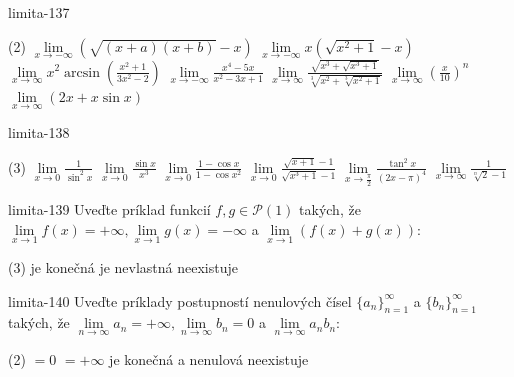 \begin{defproblem}{limita-137}
\begin{tasks}(2)
    \task $\lim\limits_{{x \rightarrow -\infty}} (\sqrt{(x+a)(x+b)}-x)$
    \task $\lim\limits_{{x \rightarrow -\infty}} x(\sqrt{x^2+1}-x)$
    \task $\lim\limits_{{x \rightarrow \infty}} x^2 \arcsin(\frac{x^2+1}{3x^2-2})$
    \task $\lim\limits_{{x \rightarrow -\infty}} \frac{x^4-5x}{x^2-3x+1}$
    \task $\lim\limits_{{x \rightarrow \infty}} \frac{\sqrt{x^3+\sqrt{x^3+1}}}{\sqrt[3]{x^2+\sqrt[3]{x^2+1}}}$
    \task $\lim\limits_{{x \rightarrow \infty}} (\frac{x}{10})^n$
    \task $\lim\limits_{{x \rightarrow \infty}} (2x+x \sin x)$
\end{tasks}
\end{defproblem}

\begin{defproblem}{limita-138}
\begin{tasks}(3)
    \task $\lim\limits_{{x \rightarrow 0}} \frac{1}{\sin ^2 x}$
    \task $\lim\limits_{{x \rightarrow 0}} \frac{\sin x}{x^3}$
    \task $\lim\limits_{{x \rightarrow 0}} \frac{1-\cos x}{1-\cos x^2}$
    \task $\lim\limits_{{x \rightarrow 0}} \frac{\sqrt{x+1}-1}{\sqrt{x^3+1}-1}$
    \task $\lim\limits_{{x \rightarrow \frac{\pi}{2}}} \frac{\tan ^2 x}{(2x-\pi)^4}$
    \task $\lim\limits_{{x \rightarrow \infty}} \frac{1}{\sqrt[n]{2}-1}$
\end{tasks}
\end{defproblem}

\begin{defproblem}{limita-139}
Uveďte príklad funkcií $f,g \in \mathcal{P}(1)$ takých, že $\lim\limits_{x
\rightarrow 1} f(x)=+\infty,\lim\limits_{x \rightarrow 1} g(x)=-\infty$ a
$\lim\limits_{x \rightarrow 1} (f(x)+g(x))$:
\begin{tasks}(3)
\task je konečná
\task je nevlastná
\task neexistuje
\end{tasks}
\end{defproblem}

\begin{defproblem}{limita-140}
Uveďte príklady postupností nenulových čísel ${\{a_n\}}_{n=1}^\infty$ a
${\{b_n\}}_{n=1}^\infty$ takých, že $\lim\limits_{n \rightarrow \infty}
a_n=+\infty,\lim\limits_{n \rightarrow \infty} b_n=0$ a $\lim\limits_{n
\rightarrow \infty} a_nb_n$:
\begin{tasks}(2)
\task $=0$
\task $=+\infty$
\task je konečná a nenulová
\task neexistuje
\end{tasks}
\end{defproblem}

